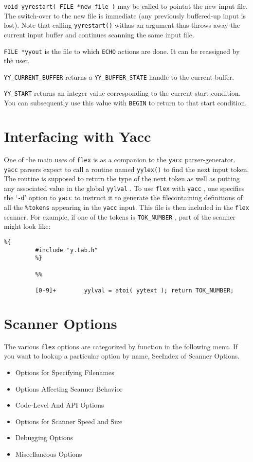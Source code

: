 \documentclass[openany,oneside]{book}
\begin{document}
 \verb`void yyrestart( FILE *new_file )` may be called to pointat the new input file.  The
switch-over to the new file is immediate (any previously buffered-up
input is lost).  Note that calling \verb`yyrestart()` withas an argument thus throws away the current input buffer and continues
scanning the same input file.

 \verb`FILE *yyout` is the file to which \verb`ECHO` actions are done.  It can be reassigned
by the user.

 \verb`YY_CURRENT_BUFFER` returns a \verb`YY_BUFFER_STATE` handle to the current buffer.

 \verb`YY_START` returns an integer value corresponding to the current start condition. 
You can subsequently use this value with \verb`BEGIN` to return to that
start condition.
\chapter{Interfacing with Yacc}


One of the main uses of \verb`flex` is as a companion to the \verb`yacc` parser-generator. \verb`yacc` parsers expect to call a routine named \verb`yylex()` to find the next input token.  The routine is supposed to
return the type of the next token as well as putting any associated
value in the global \verb`yylval` .  To use \verb`flex` with \verb`yacc` ,
one specifies the ‘\verb`-d`’ option to \verb`yacc` to instruct it to
generate the filecontaining definitions of all the \verb`%tokens` appearing in the \verb`yacc` input.  This file is then
included in the \verb`flex` scanner.  For example, if one of the tokens
is \verb`TOK_NUMBER` , part of the scanner might look like:


\begin{verbatim}
%{
         #include "y.tab.h"
         %}
     
         %%
     
         [0-9]+        yylval = atoi( yytext ); return TOK_NUMBER;
\end{verbatim}

\chapter{Scanner Options}


The various \verb`flex` options are categorized by function in the following
menu. If you want to lookup a particular option by name, SeeIndex of Scanner Options.
\begin{itemize}
\item Options for Specifying Filenames
\item Options Affecting Scanner Behavior
\item Code-Level And API Options
\item Options for Scanner Speed and Size
\item Debugging Options
\item Miscellaneous Options
\end{itemize}
\end{document}
